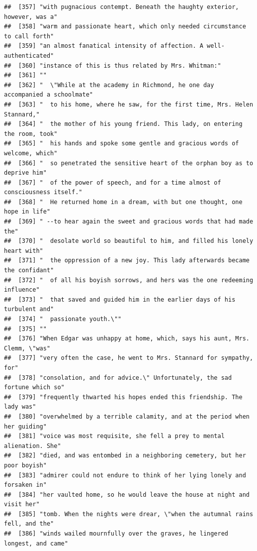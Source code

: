 \documentclass{article}\usepackage[]{graphicx}\usepackage[]{color}
\makeatletter
\newenvironment{kframe}{%
 \def\at@end@of@kframe{}%
 \ifinner\ifhmode%
  \def\at@end@of@kframe{\end{minipage}}%
  \begin{minipage}{\columnwidth}%
 \fi\fi%
 \def\FrameCommand##1{\hskip\@totalleftmargin \hskip-\fboxsep
 \colorbox{shadecolor}{##1}\hskip-\fboxsep
     \hskip-\linewidth \hskip-\@totalleftmargin \hskip\columnwidth}%
 \MakeFramed {\advance\hsize-\width
   \@totalleftmargin\z@ \linewidth\hsize
   \@setminipage}}%
 {\par\unskip\endMakeFramed%
 \at@end@of@kframe}
\newenvironment{knitrout}{}{} %
\makeatother
\begin{document}
\begin{knitrout}
\begin{kframe}
\begin{verbatim}
##  [357] "with pugnacious contempt. Beneath the haughty exterior, however, was a"      
##  [358] "warm and passionate heart, which only needed circumstance to call forth"     
##  [359] "an almost fanatical intensity of affection. A well-authenticated"            
##  [360] "instance of this is thus related by Mrs. Whitman:"                           
##  [361] ""                                                                            
##  [362] "  \"While at the academy in Richmond, he one day accompanied a schoolmate"   
##  [363] "  to his home, where he saw, for the first time, Mrs. Helen Stannard,"       
##  [364] "  the mother of his young friend. This lady, on entering the room, took"     
##  [365] "  his hands and spoke some gentle and gracious words of welcome, which"      
##  [366] "  so penetrated the sensitive heart of the orphan boy as to deprive him"     
##  [367] "  of the power of speech, and for a time almost of consciousness itself."    
##  [368] "  He returned home in a dream, with but one thought, one hope in life"       
##  [369] " --to hear again the sweet and gracious words that had made the"             
##  [370] "  desolate world so beautiful to him, and filled his lonely heart with"      
##  [371] "  the oppression of a new joy. This lady afterwards became the confidant"    
##  [372] "  of all his boyish sorrows, and hers was the one redeeming influence"       
##  [373] "  that saved and guided him in the earlier days of his turbulent and"        
##  [374] "  passionate youth.\""                                                       
##  [375] ""                                                                            
##  [376] "When Edgar was unhappy at home, which, says his aunt, Mrs. Clemm, \"was"     
##  [377] "very often the case, he went to Mrs. Stannard for sympathy, for"             
##  [378] "consolation, and for advice.\" Unfortunately, the sad fortune which so"      
##  [379] "frequently thwarted his hopes ended this friendship. The lady was"           
##  [380] "overwhelmed by a terrible calamity, and at the period when her guiding"      
##  [381] "voice was most requisite, she fell a prey to mental alienation. She"         
##  [382] "died, and was entombed in a neighboring cemetery, but her poor boyish"       
##  [383] "admirer could not endure to think of her lying lonely and forsaken in"       
##  [384] "her vaulted home, so he would leave the house at night and visit her"        
##  [385] "tomb. When the nights were drear, \"when the autumnal rains fell, and the"   
##  [386] "winds wailed mournfully over the graves, he lingered longest, and came"      

\end{verbatim}
\end{kframe}
\end{knitrout}
\end{document}
